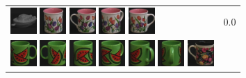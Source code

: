 \begin{figure}[tbp]
\begin{center}
\begin{tabular}{m{11cm} | m{3cm} |}
\includegraphics[width=1cm]{coil/beeld-29.eps}
\includegraphics[width=1cm]{coil/beeld-8.eps}
\includegraphics[width=1cm]{coil/beeld-7.eps}
\includegraphics[width=1cm]{coil/beeld-9.eps}
\includegraphics[width=1cm]{coil/beeld-6.eps}
& {\scriptsize 0.0}
\\
\includegraphics[width=1cm]{coil/beeld-30.eps}
\includegraphics[width=1cm]{coil/beeld-31.eps}
\includegraphics[width=1cm]{coil/beeld-32.eps}
\includegraphics[width=1cm]{coil/beeld-33.eps}
\includegraphics[width=1cm]{coil/beeld-34.eps}
\includegraphics[width=1cm]{coil/beeld-35.eps}
\includegraphics[width=1cm]{coil/beeld-61.eps}

\end{tabular}
\end{center}
\end{figure}
